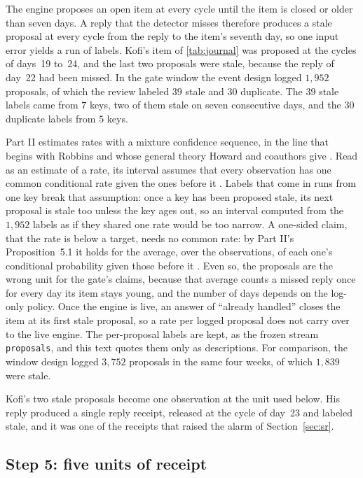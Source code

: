 \documentclass[11pt]{article}
\newcommand{\code}[1]{\texttt{#1}}
\theoremstyle{definition}
\theoremstyle{plain}
\begin{document}
The engine proposes an open item at every cycle until the item is closed or older than seven days.
A reply that the detector misses therefore produces a stale proposal at every cycle from the reply
to the item's seventh day, so one input error yields a run of labels. Kofi's item of
\cref{tab:journal} was proposed at the cycles of days~19 to~24, and the last two proposals were
stale, because the reply of day~22 had been missed. In the gate window the event design logged
$1{,}952$ proposals, of which the review labeled $39$ stale and $30$ duplicate. The $39$ stale labels
came from $7$ keys, two of them stale on seven consecutive days, and the $30$ duplicate labels from
$5$ keys.

Part II estimates rates with a mixture confidence sequence, in the line that begins with Robbins
\cite{robbins} and whose general theory Howard and coauthors give \cite{howard}. Read as an estimate
of a rate, its interval assumes that every observation has one common conditional rate given the
ones before it \cite[Section~5.1]{part2}. Labels that come in runs from one key break that
assumption: once a key has been proposed stale, its next proposal is stale too unless the key ages
out, so an interval computed from the $1{,}952$ labels as if they shared one rate would be too narrow.
A one-sided claim, that the rate is below a target, needs no common rate: by Part II's
Proposition~5.1 it holds for the average, over the observations, of each one's conditional
probability given those before it \cite[Proposition~5.1]{part2}. Even so, the proposals are the
wrong unit for the gate's claims, because that average counts a missed reply once for every day its
item stays young, and the number of days depends on the log-only policy. Once the engine is live, an
answer of ``already handled'' closes the item at its first stale proposal, so a rate per logged
proposal does not carry over to the live engine. The per-proposal labels are kept, as the frozen
stream \code{proposals}, and this text quotes them only as descriptions. For comparison, the window
design logged $3{,}752$ proposals in the same four weeks, of which $1{,}839$ were stale.

Kofi's two stale proposals become one observation at the unit used below. His reply produced a
single reply receipt, released at the cycle of day~23 and labeled stale, and it was one of the
receipts that raised the alarm of Section~\ref{sec:sr}.

\subsection{Step 5: five units of receipt}\label{sec:fiveunits}
\end{document}
